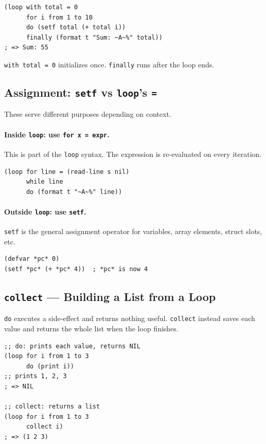 \begin{lstlisting}
(loop with total = 0
      for i from 1 to 10
      do (setf total (+ total i))
      finally (format t "Sum: ~A~%" total))
; => Sum: 55
\end{lstlisting}

\texttt{with total = 0} initializes once.
\texttt{finally} runs after the loop ends.

\subsection{Assignment: \texttt{setf} vs \texttt{loop}'s \texttt{=}}

These serve different purposes depending on context.

\paragraph{Inside \texttt{loop}: use \texttt{for x = expr}.}
This is part of the \texttt{loop} syntax. The expression is
re-evaluated on every iteration.

\begin{lstlisting}
(loop for line = (read-line s nil)
      while line
      do (format t "~A~%" line))
\end{lstlisting}

\paragraph{Outside \texttt{loop}: use \texttt{setf}.}
\texttt{setf} is the general assignment operator for variables,
array elements, struct slots, etc.

\begin{lstlisting}
(defvar *pc* 0)
(setf *pc* (+ *pc* 4))  ; *pc* is now 4
\end{lstlisting}

\subsection{\texttt{collect} --- Building a List from a Loop}

\texttt{do} executes a side-effect and returns nothing useful.
\texttt{collect} instead saves each value and returns the whole list
when the loop finishes.

\begin{lstlisting}
;; do: prints each value, returns NIL
(loop for i from 1 to 3
      do (print i))
;; prints 1, 2, 3
; => NIL

;; collect: returns a list
(loop for i from 1 to 3
      collect i)
; => (1 2 3)
\end{lstlisting}

